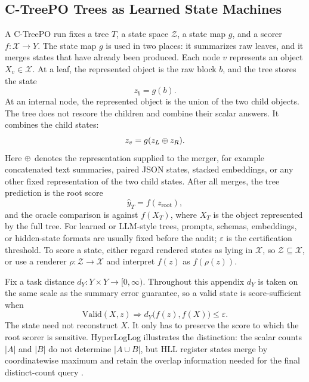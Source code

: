 \subsection{C-TreePO Trees as Learned State Machines}
\label{app:v6-ctreepo-state-machine}

A C-TreePO run fixes a tree \(T\), a state space \(\mathcal{Z}\), a state map
\(g\), and a scorer \(f:\mathcal{X}\to Y\).  The state map \(g\) is used in
two places: it summarizes raw leaves, and it merges states that have already
been produced.  Each node \(v\) represents an object
\(X_v\in\mathcal{X}\).  At a leaf, the represented object is the raw block
\(b\), and the tree stores the state
\[
  z_b = g(b).
\]
At an internal node, the represented object is the union of the two child
objects.  The tree does not rescore the children and combine their scalar
answers.  It combines the child states:
\[
  z_v = g(z_L\oplus z_R).
\]
Here \(\oplus\) denotes the representation supplied to the merger, for
example concatenated text summaries, paired JSON states, stacked embeddings,
or any other fixed representation of the two child states.  After all merges,
the tree prediction is the root score
\[
  \widehat y_T = f(z_{\mathrm{root}}),
\]
and the oracle comparison is against \(f(X_T)\), where \(X_T\) is the object
represented by the full tree.  For learned or LLM-style trees, prompts,
schemas, embeddings, or hidden-state formats are usually fixed before the
audit; \(\varepsilon\) is the certification threshold.  To score a state,
either regard rendered states as lying in \(\mathcal{X}\), so
\(\mathcal{Z}\subseteq\mathcal{X}\), or use a renderer
\(\rho:\mathcal{Z}\to\mathcal{X}\) and interpret \(f(z)\) as \(f(\rho(z))\).

Fix a task distance \(d_Y:Y\times Y\to[0,\infty)\).  Throughout this appendix
\(d_Y\) is taken on the same scale as the summary error guarantee, so a valid
state is score-sufficient when
\[
  \mathrm{Valid}(X,z)
  \Longrightarrow
  d_Y\big(f(z),f(X)\big)\le\varepsilon.
\]
The state need not reconstruct \(X\).  It only has to preserve the score to
which the root scorer is sensitive.  HyperLogLog illustrates the distinction:
the scalar counts \(|A|\) and \(|B|\) do not determine \(|A\cup B|\), but HLL
register states merge by coordinatewise maximum and retain the overlap
information needed for the final distinct-count query
\citep{FlajoletEtAl2007,HeuleEtAl2013}.

